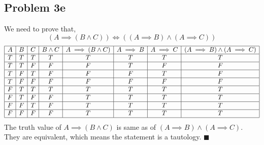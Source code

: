 \documentclass[answers]{exam}
\theoremstyle{mytheoremstyle}
\theoremstyle{mytheoremstyle}
\theoremstyle{myproblemstyle}
\begin{document}
\subsection*{Problem 3e}
\begin{framed}
    We need to prove that,
    \[\left(A\implies( B\land C)\right)\iff \left((A\implies B)\land (A\implies C)\right)\]
    \begin{displaymath}
        \begin{array}{|c|c|c|c|c|c|c|c|}
            \hline
            A & B & C & B\land C & A\implies (B\land C) & A\implies B & A\implies C & (A\implies B) \land (A\implies C) \\\hline
            T & T & T & T        & T                    & T           & T           & T                                 \\\hline
            T & T & F & F        & F                    & T           & F           & F                                 \\\hline
            T & F & T & F        & F                    & F           & T           & F                                 \\\hline
            T & F & F & F        & F                    & F           & F           & F                                 \\\hline
            F & T & T & T        & T                    & T           & T           & T                                 \\\hline
            F & T & F & F        & T                    & T           & T           & T                                 \\\hline
            F & F & T & F        & T                    & T           & T           & T                                 \\\hline
            F & F & F & F        & T                    & T           & T           & T                                 \\\hline
        \end{array}
    \end{displaymath}
    The truth value of \(A\implies(B\land C)\) is same as of \((A\implies B)\land (A\implies C)\). They are equivalent, which means the statement is a tautology. \(\blacksquare\)
\end{framed}
\newpage
\end{document}
